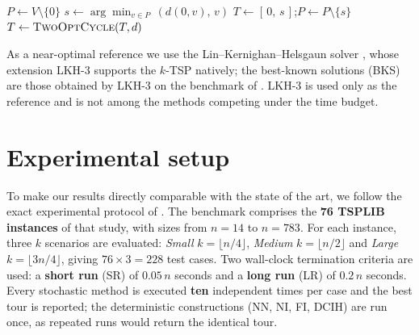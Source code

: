 \documentclass[sn-chicago]{sn-jnl}
\begin{document}
\begin{algorithm}[t]
\DontPrintSemicolon
{}
$P \leftarrow V\setminus\{0\}$\;
$s \leftarrow \arg\min_{v\in P}\,(d(0,v),\,v)$ 
$T \leftarrow [\,0,\,s\,]$;\quad $P\leftarrow P\setminus\{s\}$\;
$T \leftarrow \textsc{TwoOptCycle}(T,d)$\;
\;
\caption{DCIH for the $k$-TSP}\label{alg:dci}
\end{algorithm}

As a near-optimal reference we use the Lin--Kernighan--Helsgaun solver
\citep{Helsgaun,lin1973}, whose extension LKH-3 \citep{helsgaun2017lkh3} supports
the $k$-TSP natively; the best-known solutions (BKS) are those obtained by LKH-3 on
the benchmark of \citet{pandiri2020}. LKH-3 is used only as the reference and is
not among the methods competing under the time budget.

\section{Experimental setup}\label{sec:setup}

To make our results directly comparable with the state of the art, we follow the
exact experimental protocol of \citet{pandiri2020}. The benchmark comprises the
\textbf{76 TSPLIB instances} \citep{TSPLIB} of that study, with sizes from $n=14$
to $n=783$. For each instance, three $k$ scenarios are evaluated: \emph{Small}
$k=\lfloor n/4\rfloor$, \emph{Medium} $k=\lfloor n/2\rfloor$ and \emph{Large}
$k=\lfloor 3n/4\rfloor$, giving $76\times 3 = 228$ test cases. Two wall-clock
termination criteria are used: a \textbf{short run} (SR) of $0.05\,n$ seconds and a
\textbf{long run} (LR) of $0.2\,n$ seconds. Every stochastic method is executed
\textbf{ten} independent times per case and the best tour is reported; the
deterministic constructions (NN, NI, FI, DCIH) are run once, as repeated runs would
return the identical tour.
\end{document}
